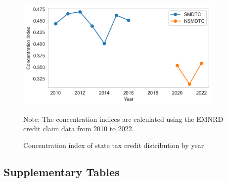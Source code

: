 \documentclass[11pt,twoside,letterpaper]{article}
\begin{document}
\begin{figure}[H]
    \centering
\includegraphics[width=0.9\textwidth]{figures/concentration_index_by_year.png}
    \caption{Concentration index of state tax credit distribution by year}
    \label{fig:concentration_index}
          \begin{flushleft}
        \footnotesize Note: The concentration indices are calculated using the EMNRD credit claim data from 2010 to 2022.  
    \end{flushleft}
\end{figure}

\newpage

\subsection{Supplementary Tables}
\end{document}
